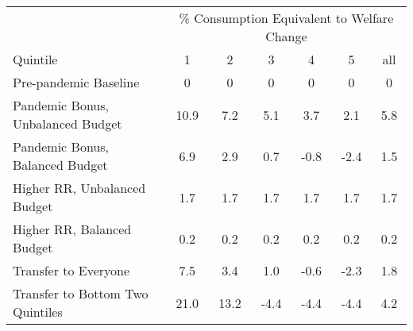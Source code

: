 \begin{center}
\begin{adjustbox}{width=\textwidth}
\begin{tabular}{lcccccc}\toprule
 & \multicolumn{6}{c}{\% Consumption Equivalent to Welfare Change} \\
\cline{2-7}
Quintile & 1 & 2 & 3 & 4 & 5 & all \\
\midrule
Pre-pandemic Baseline & 0 & 0 & 0 & 0 & 0 & 0 \\
Pandemic Bonus, Unbalanced Budget & 10.9 & 7.2 & 5.1 & 3.7 & 2.1 & 5.8 \\
Pandemic Bonus, Balanced Budget & 6.9 & 2.9 & 0.7 & -0.8 & -2.4 & 1.5 \\
Higher RR, Unbalanced Budget & 1.7 & 1.7 & 1.7 & 1.7 & 1.7 & 1.7 \\
Higher RR, Balanced Budget & 0.2 & 0.2 & 0.2 & 0.2 & 0.2 & 0.2 \\
Transfer to Everyone & 7.5 & 3.4 & 1.0 & -0.6 & -2.3 & 1.8 \\
Transfer to Bottom Two Quintiles & 21.0 & 13.2 & -4.4 & -4.4 & -4.4 & 4.2 \\
\bottomrule\end{tabular}
\end{adjustbox}
\end{center}